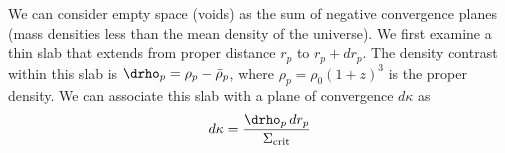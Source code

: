 We can consider empty space (voids) as the sum of negative convergence planes  (mass densities less than the mean density of the universe). We first examine a thin slab that extends from proper distance $r_p$ to $r_p+dr_p$.  The density contrast within this slab is $\drho_p = \rho_p - \bar\rho_p$, where $\rho_p = \rho_0 (1+z)^3$ is the proper density.  We can associate this slab with a plane of convergence $d\kappa$ as
  \begin{equation}
  d\kappa = \frac{\drho_p\,dr_p}{\Sigma_{\rm crit}}
 \end{equation}